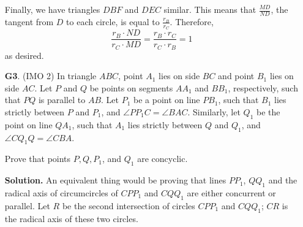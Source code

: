\documentclass[11pt,a4paper]{article}
\begin{document}
\begin{enumerate}
	Finally, we have triangles $DBF$ and $DEC$ similar. This means that $\frac{MD}{ND}$, the tangent from $D$ to each circle, is equal to $\frac{r_B}{r_C}$. Therefore, 
	\[
	\frac{r_B\cdot ND}{r_C\cdot MD} = \frac{r_B\cdot r_C}{r_C\cdot r_B} = 1
	\]
	as desired. 
	
	
	\item [\textbf{G3}.] (IMO 2) In triangle $ABC$, point $A_1$ lies on side $BC$ and point $B_1$ lies on side $AC$. Let $P$ and $Q$ be points on segments $AA_1$ and $BB_1$, respectively, such that $PQ$ is parallel to $AB$. Let $P_1$ be a point on line $PB_1$, such that $B_1$ lies strictly between $P$ and $P_1$, and $\angle PP_1C=\angle BAC$. Similarly, let $Q_1$ be the point on line $QA_1$, such that $A_1$ lies strictly between $Q$ and $Q_1$, and $\angle CQ_1Q=\angle CBA$.
	
	Prove that points $P,Q,P_1$, and $Q_1$ are concyclic.
	
	\textbf{Solution.} An equivalent thing would be proving that lines $PP_1$, $QQ_1$ and the radical axis of circumcircles of $CPP_1$ and $CQQ_1$ are either concurrent or parallel. Let $R$ be the second intersection of circles $CPP_1$ and $CQQ_1$; $CR$ is the radical axis of these two circles. 
	

\end{enumerate}
\end{document}
